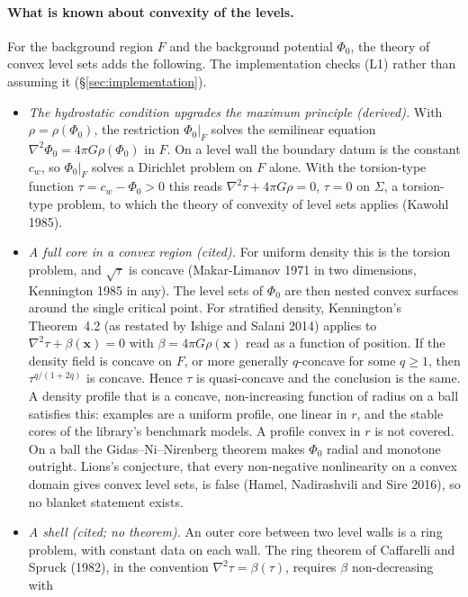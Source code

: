 \documentclass[11pt]{article}
\theoremstyle{definition}
\theoremstyle{remark}
\newcommand{\bx}{\mathbf{x}}
\begin{document}
\paragraph{What is known about convexity of the levels.} For the
background region $F$ and the background potential $\Phi_0$, the
theory of convex level sets adds the following. The implementation
checks (L1) rather than assuming it (\S\ref{sec:implementation}).
\begin{itemize}
\item \emph{The hydrostatic condition upgrades the maximum principle
  (derived).} With $\rho = \rho(\Phi_0)$, the restriction $\Phi_0|_F$
  solves the semilinear equation $\nabla^2\Phi_0 = 4\pi
  G\rho(\Phi_0)$ in $F$. On a level wall the boundary datum is the
  constant $c_w$, so $\Phi_0|_F$ solves a Dirichlet problem on $F$
  alone. With the torsion-type function $\tau = c_w - \Phi_0 > 0$ this
  reads $\nabla^2\tau + 4\pi G\rho = 0$, $\tau = 0$ on $\Sigma$, a
  torsion-type problem, to which the theory of convexity of level sets
  applies (Kawohl 1985).
\item \emph{A full core in a convex region (cited).} For uniform
  density this is the torsion problem, and $\sqrt\tau$ is concave
  (Makar-Limanov 1971 in two dimensions, Kennington 1985 in any). The
  level sets of $\Phi_0$ are then nested convex surfaces around the
  single critical point. For stratified density, Kennington's
  Theorem~4.2 (as restated by Ishige and Salani 2014) applies to
  $\nabla^2\tau + \beta(\bx) = 0$ with $\beta = 4\pi G\rho(\bx)$ read as
  a function of position. If the density field is concave on $F$, or
  more generally $q$-concave for some $q \ge 1$, then
  $\tau^{q/(1+2q)}$ is concave. Hence $\tau$ is quasi-concave and the
  conclusion is the same. A density profile that is a concave,
  non-increasing function of radius on a ball satisfies this:
  examples are a uniform profile, one linear in $r$, and the stable
  cores of the library's benchmark models. A profile convex in $r$ is
  not covered. On a ball the Gidas--Ni--Nirenberg theorem makes
  $\Phi_0$ radial and monotone outright. Lions's conjecture, that every
  non-negative nonlinearity on a convex domain gives convex level sets,
  is false (Hamel, Nadirashvili and Sire 2016), so no blanket statement
  exists.
\item \emph{A shell (cited; no theorem).} An outer core between two
  level walls is a ring problem, with constant data on each wall. The
  ring theorem of Caffarelli and Spruck (1982), in the convention
  $\nabla^2\tau = \beta(\tau)$, requires $\beta$ non-decreasing with

\end{itemize}
\end{document}
